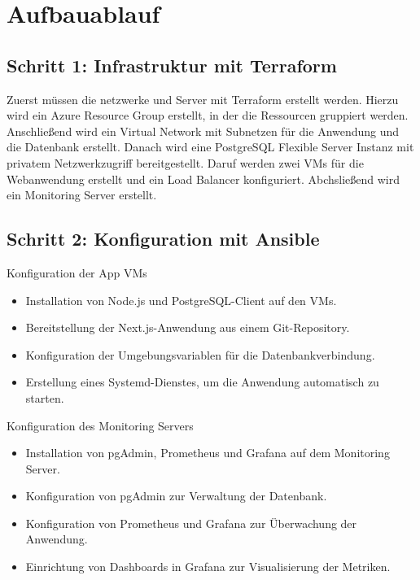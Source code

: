 \section{Aufbauablauf}

\subsection{Schritt 1: Infrastruktur mit Terraform}
Zuerst müssen die netzwerke und Server mit Terraform erstellt werden. Hierzu wird ein Azure Resource Group erstellt, in der die Ressourcen gruppiert werden. Anschließend wird ein Virtual Network mit Subnetzen für die Anwendung und die Datenbank erstellt. Danach wird eine PostgreSQL Flexible Server Instanz mit privatem Netzwerkzugriff bereitgestellt. Daruf werden zwei VMs für die Webanwendung erstellt und ein Load Balancer konfiguriert. Abchsließend wird ein Monitoring Server erstellt.

\subsection{Schritt 2: Konfiguration mit Ansible}
Konfiguration der App VMs
\begin{itemize}
    \item Installation von Node.js und PostgreSQL-Client auf den VMs.
    \item Bereitstellung der Next.js-Anwendung aus einem Git-Repository.
    \item Konfiguration der Umgebungsvariablen für die Datenbankverbindung.
    \item Erstellung eines Systemd-Dienstes, um die Anwendung automatisch zu starten.
\end{itemize}

Konfiguration des Monitoring Servers
\begin{itemize}
    \item Installation von pgAdmin, Prometheus und Grafana auf dem Monitoring Server.
    \item Konfiguration von pgAdmin zur Verwaltung der Datenbank.
    \item Konfiguration von Prometheus und Grafana zur Überwachung der Anwendung.
    \item Einrichtung von Dashboards in Grafana zur Visualisierung der Metriken.
\end{itemize}
